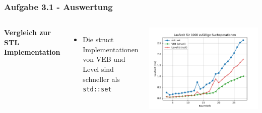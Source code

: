 \documentclass[aspectratio=169]{beamer}
\begin{document}
\begin{frame}
	\frametitle{Aufgabe 3.1 - Auswertung}
	\begin{columns}[c] %
		
		\textbf{Vergleich zur STL Implementation}
		\begin{itemize}
			\item Die struct Implementationen von VEB und Level sind schneller als \texttt{std::set}
		\end{itemize}
		
		\includegraphics[scale=.6]{set_level_veb.pdf}
		
		
	\end{columns}
	\end{frame}
	
\end{document}
